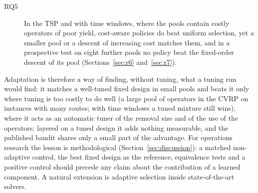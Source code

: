 \begin{description}
\item[RQ5] In the TSP and with time windows, where the pools contain costly operators of poor yield, cost-aware policies do beat uniform selection, yet a smaller pool or a descent of increasing cost matches them, and in a prospective test on eight further pools no policy beat the fixed-order descent of its pool (Sections~\ref{sec:r6} and~\ref{sec:r7}).
\end{description}
Adaptation is therefore a way of finding, without tuning, what a tuning run would find: it matches a well-tuned fixed design in small pools and beats it only where tuning is too costly to do well (a large pool of operators in the CVRP on instances with many routes; with time windows a tuned mixture still wins), where it acts as an automatic tuner of the removal size and of the use of the operators; layered on a tuned design it adds nothing measurable, and the published bandit shares only a small part of the advantage. For operations research the lesson is methodological (Section~\ref{sec:discussion}): a matched non-adaptive control, the best fixed design as the reference, equivalence tests and a positive control should precede any claim about the contribution of a learned component. A natural extension is adaptive selection inside state-of-the-art solvers.
